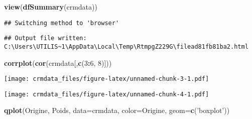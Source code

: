 \documentclass[]{article}
\newenvironment{Shaded}{\begin{snugshade}}{\end{snugshade}}
\newcommand{\DataTypeTok}[1]{\textcolor[rgb]{0.13,0.29,0.53}{#1}}
\newcommand{\DecValTok}[1]{\textcolor[rgb]{0.00,0.00,0.81}{#1}}
\newcommand{\KeywordTok}[1]{\textcolor[rgb]{0.13,0.29,0.53}{\textbf{#1}}}
\newcommand{\NormalTok}[1]{#1}
\newcommand{\OperatorTok}[1]{\textcolor[rgb]{0.81,0.36,0.00}{\textbf{#1}}}
\newcommand{\OtherTok}[1]{\textcolor[rgb]{0.56,0.35,0.01}{#1}}
\newcommand{\StringTok}[1]{\textcolor[rgb]{0.31,0.60,0.02}{#1}}
\begin{document}
\begin{Shaded}
\begin{Highlighting}[]
\KeywordTok{view}\NormalTok{(}\KeywordTok{dfSummary}\NormalTok{(crmdata))}
\end{Highlighting}
\end{Shaded}

\begin{verbatim}
## Switching method to 'browser'
\end{verbatim}

\begin{verbatim}
## Output file written: C:\Users\UTILIS~1\AppData\Local\Temp\RtmpgZ229G\filead81fb81ba2.html
\end{verbatim}

\begin{Shaded}
\begin{Highlighting}[]
\KeywordTok{corrplot}\NormalTok{(}\KeywordTok{cor}\NormalTok{(crmdata[,}\KeywordTok{c}\NormalTok{(}\DecValTok{3}\OperatorTok{:}\DecValTok{6}\NormalTok{, }\DecValTok{8}\NormalTok{)]))}
\end{Highlighting}
\end{Shaded}

\texttt{[image: crmdata\_files/figure-latex/unnamed-chunk-3-1.pdf]}

\begin{Shaded}
\end{Shaded}

\texttt{[image: crmdata\_files/figure-latex/unnamed-chunk-4-1.pdf]}

\begin{Shaded}
\begin{Highlighting}[]
\KeywordTok{qplot}\NormalTok{(Origine, Poids, }\DataTypeTok{data=}\NormalTok{crmdata, }\DataTypeTok{color=}\NormalTok{Origine, }\DataTypeTok{geom=}\KeywordTok{c}\NormalTok{(}\StringTok{'boxplot'}\NormalTok{))}
\end{Highlighting}
\end{Shaded}
\end{document}
